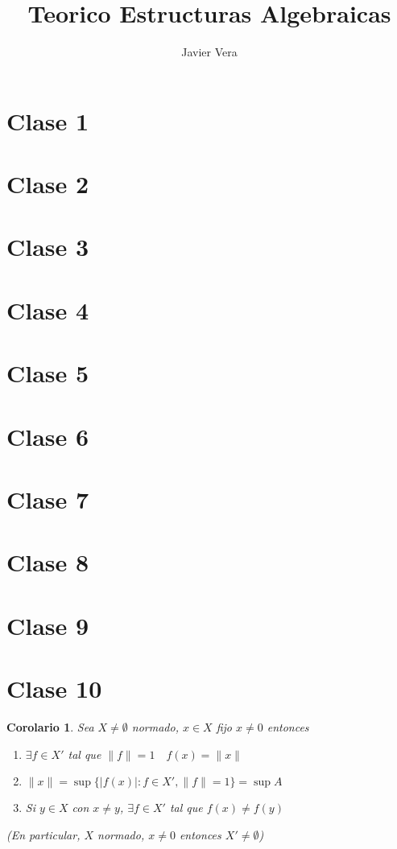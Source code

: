 \documentclass[10pt]{extarticle}
\theoremstyle{break}
\newtheorem{corollary}{Corolario}[theorem]
\theoremstyle{definition}
\begin{document}
\title{Teorico Estructuras Algebraicas}
\author{Javier Vera}
\maketitle

\section{Clase 1}
\section{Clase 2}
\section{Clase 3}
\section{Clase 4}
\section{Clase 5}
\section{Clase 6}
\section{Clase 7}
\section{Clase 8}
\section{Clase 9}
\section{Clase 10}

\begin{corollary}\label{10.0}
	Sea $X\neq \emptyset$ normado, $x\in X$ fijo $x\neq 0$ entonces 
	\begin{enumerate}[(a.)]
		\item $\exists f\in X'$ tal que $\lVert f \rVert =1 \quad f(x)=\lVert x \rVert$
		\item $\lVert x \rVert=\sup \{ \lvert f(x) \rvert : f\in X',\lVert f \rVert=1\} =\sup A$
		\item Si $y\in X$ con $x\neq y$, $\exists f\in X'$ tal que $f(x)\neq f(y)$
	\end{enumerate}	(En particular, $X$ normado, $x\neq 0$ entonces $X'\neq \emptyset$)
\end{corollary}
\end{document}
